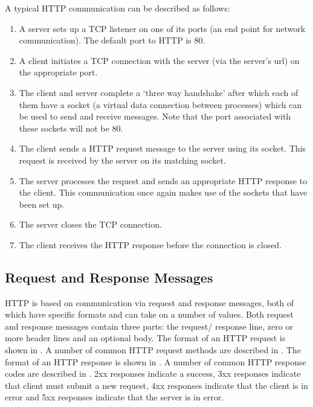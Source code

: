\documentclass[10pt,twocolumn]{witseiepaper}
\begin{document}
A typical HTTP communication can be described as follows: 
\begin{enumerate}
	\item A server sets up a TCP listener on one of its ports (an end point for network communication). The default port to HTTP is 80. 
	\item A client initiates a TCP connection with the server (via the server's url) on the appropriate port. 
	\item The client and server complete a `three way handshake' after which each of them have a socket (a virtual data connection between processes) which can be used to send and receive messages. Note that the port associated with these sockets will not be 80.
	\item The client sends a HTTP request message to the server using its socket. This request is received by the server on its matching socket.
	\item The server processes the request and sends an appropriate HTTP response to the client. This communication once again makes use of the sockets that have been set up. 
	\item The server closes the TCP connection.
	\item The client receives the HTTP response before the connection is closed.
\end{enumerate}

	\subsection{Request and Response Messages}

	HTTP is based on communication via request and response messages, both of which have specific formats and can take on a number of values. Both request and response messages contain three parts: the request/ response line, zero or more header lines and an optional body. The format of an HTTP request is shown in . A number of common HTTP request methods are described in . The format of an HTTP response is shown in . A number of common HTTP response codes are described in . 2xx responses indicate a success, 3xx responses indicate that client must submit a new request, 4xx responses indicate that the client is in error and 5xx responses indicate that the server is in error.
\end{document}

